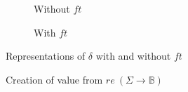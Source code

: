 \begin{figure}
  \centering
  \begin{subfigure}{0.5\linewidth}
  \centering
  
\caption{Without $ft$}
\label{fig:delta-no-ft}
\end{subfigure}%
%
\begin{subfigure}{0.4\linewidth}
  \centering
  
\caption{With $ft$}
\label{fig:delta-yes-ft}
\end{subfigure}
\caption{Representations of $\delta$ with and without $ft$}
\label{fig:delta-ft-yes-no}
\end{figure}


\begin{figure}
  \centering
  
  \caption{Creation of  value from $re\ (\Sigma \to \mathbb{B})$}
  \label{fig:re-ft-nfa-run-overview}
\end{figure}


